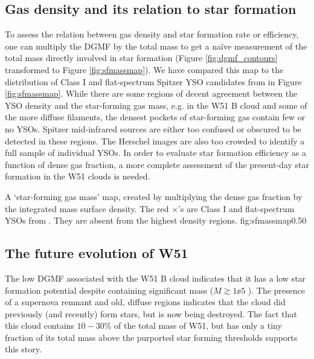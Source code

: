 \subsection{Gas density and its relation to star formation}
%

To assess the relation between gas density and star formation rate or
efficiency, one can multiply the DGMF by the total mass to get a naïve
measurement of the total mass directly involved in star formation (Figure
\ref{fig:dgmf_contours} transformed to Figure \ref{fig:sfmassmap}).  We have
compared this map to the distribution of Class I and flat-spectrum Spitzer YSO
candidates from \citet{Kang2009a} in Figure \ref{fig:sfmassmap}.  While there
are some regions of decent agreement between the YSO density and the
star-forming gas mass, e.g.  in the W51 B cloud and some of the more diffuse
filaments, the densest pockets of star-forming gas contain few or no YSOs.
Spitzer mid-infrared sources are either too confused or obscured to be detected
in these regions.  The Herschel images are also too crowded to identify a full
sample of individual YSOs.  In order to evaluate star formation efficiency as a
function of dense gas fraction, a more complete assessment of the present-day
star formation in the W51 clouds is needed.

{A `star-forming gas mass' map, created by multiplying the dense gas fraction
by the integrated \thirteenco mass surface density.  The red $\times$'s are
Class I and flat-spectrum YSOs from \citet{Kang2009a}.  They are absent from
the highest density regions.
}
{fig:sfmassmap}{0.5}{0}

\subsection{The future evolution of W51}
\label{sec:futureev}
The low DGMF associated with the W51 B cloud indicates that it has a
low star formation potential despite containing significant mass
($M\gtrsim1\ee{5}$ \msun).  The presence of a supernova remnant and old,
diffuse \hii regions indicates that the cloud did previously (and recently) form
stars, but is now being destroyed.  The fact that this cloud contains $10-30\%$
of the total mass of W51, but has only a tiny fraction of its total mass above
the purported star forming thresholds supports this story.

